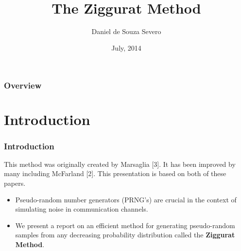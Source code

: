 \documentclass{beamer}
\title[The Ziggurat Method]{The Ziggurat Method} %
\author{Daniel de Souza Severo}
\institute[UofT]
{
University of Toronto\\ %
\medskip
\textit{danielsouzasevero@gmail.com} %
}
\date{July, 2014}
\begin{document}
\begin{frame}
\titlepage %
\end{frame}

\begin{frame}
\frametitle{Overview} %
\tableofcontents %
\end{frame}

\section{Introduction}
	\begin{frame} 
		\frametitle{Introduction} 
		This method was originally created by Marsaglia [3]. It has been improved by many including McFarland [2]. This presentation is based on both of these papers.
		\begin{itemize}
			\item Pseudo-random number generators (PRNG’s) are crucial in the context of simulating noise in communication channels.
			\item We present a report on an efficient method for generating pseudo-random samples
from any decreasing probability distribution called the \textbf{Ziggurat Method}.
		\end{itemize}
	\end{frame}
\end{document}
